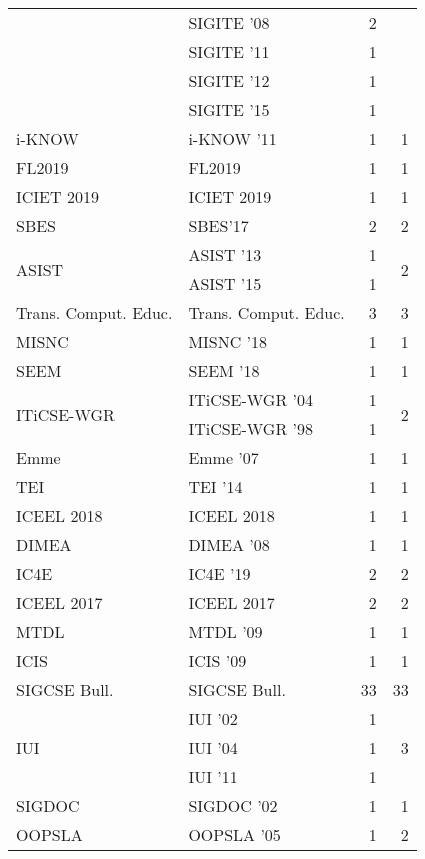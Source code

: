 \begin{table*}[t]
\begin{tabular}{llrr}
& SIGITE '08 & 2 &\\
& SIGITE '11 & 1 &\\
& SIGITE '12 & 1 &\\
& SIGITE '15 & 1 &\\
\multirow{1}{*}{i-KNOW } & i-KNOW '11 & 1 & \multirow{1}{*}{1}\\
\multirow{1}{*}{FL2019} & FL2019 & 1 & \multirow{1}{*}{1}\\
\multirow{1}{*}{ICIET 2019} & ICIET 2019 & 1 & \multirow{1}{*}{1}\\
\multirow{1}{*}{SBES} & SBES'17 & 2 & \multirow{1}{*}{2}\\
\multirow{2}{*}{ASIST } & ASIST '13 & 1 & \multirow{2}{*}{2}\\
& ASIST '15 & 1 &\\
\multirow{1}{*}{Trans. Comput. Educ.} & Trans. Comput. Educ. & 3 & \multirow{1}{*}{3}\\
\multirow{1}{*}{MISNC } & MISNC '18 & 1 & \multirow{1}{*}{1}\\
\multirow{1}{*}{SEEM } & SEEM '18 & 1 & \multirow{1}{*}{1}\\
\multirow{2}{*}{ITiCSE-WGR } & ITiCSE-WGR '04 & 1 & \multirow{2}{*}{2}\\
& ITiCSE-WGR '98 & 1 &\\
\multirow{1}{*}{Emme } & Emme '07 & 1 & \multirow{1}{*}{1}\\
\multirow{1}{*}{TEI } & TEI '14 & 1 & \multirow{1}{*}{1}\\
\multirow{1}{*}{ICEEL 2018} & ICEEL 2018 & 1 & \multirow{1}{*}{1}\\
\multirow{1}{*}{DIMEA } & DIMEA '08 & 1 & \multirow{1}{*}{1}\\
\multirow{1}{*}{IC4E } & IC4E '19 & 2 & \multirow{1}{*}{2}\\
\multirow{1}{*}{ICEEL 2017} & ICEEL 2017 & 2 & \multirow{1}{*}{2}\\
\multirow{1}{*}{MTDL } & MTDL '09 & 1 & \multirow{1}{*}{1}\\
\multirow{1}{*}{ICIS } & ICIS '09 & 1 & \multirow{1}{*}{1}\\
\multirow{1}{*}{SIGCSE Bull.} & SIGCSE Bull. & 33 & \multirow{1}{*}{33}\\
\multirow{3}{*}{IUI } & IUI '02 & 1 & \multirow{3}{*}{3}\\
& IUI '04 & 1 &\\
& IUI '11 & 1 &\\
\multirow{1}{*}{SIGDOC } & SIGDOC '02 & 1 & \multirow{1}{*}{1}\\
\multirow{2}{*}{OOPSLA } & OOPSLA '05 & 1 & \multirow{2}{*}{2}\\

\end{tabular}
\end{table*}
